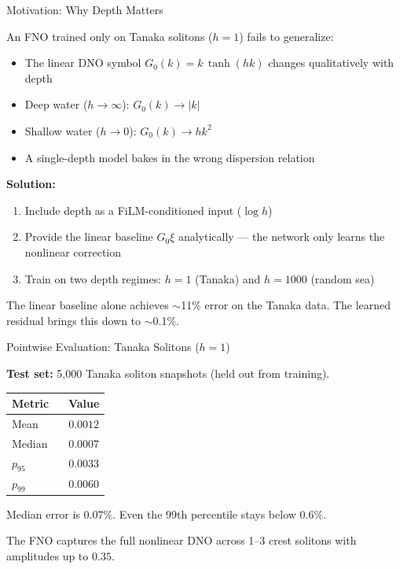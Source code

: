 \documentclass[aspectratio=169,11pt]{beamer}
\DeclareMathOperator{\relltwo}{rel\text{-}L^2}
\begin{document}
\begin{frame}{Motivation: Why Depth Matters}

An FNO trained only on Tanaka solitons ($h = 1$) fails to generalize:

\begin{itemize}
  \item The linear DNO symbol $G_0(k) = k\,\tanh(hk)$ changes qualitatively with depth
  \item Deep water ($h \to \infty$): $G_0(k) \to |k|$
  \item Shallow water ($h \to 0$): $G_0(k) \to hk^2$
  \item A single-depth model bakes in the wrong dispersion relation
\end{itemize}

\pause

\textbf{Solution:}
\begin{enumerate}
  \item Include depth as a FiLM-conditioned input ($\log h$)
  \item Provide the linear baseline $G_0\xi$ analytically --- the network only learns the nonlinear correction
  \item Train on two depth regimes: $h = 1$ (Tanaka) and $h = 1000$ (random sea)
\end{enumerate}

The linear baseline alone achieves $\sim$11\% error on the Tanaka data. The learned residual brings this down to $\sim$0.1\%.
\end{frame}

\begin{frame}{Pointwise Evaluation: Tanaka Solitons ($h = 1$)}

\textbf{Test set:} 5,000 Tanaka soliton snapshots (held out from training).

\pause

\begin{center}
\begin{tabular}{lc}
\toprule
Metric & Value \\
\midrule
Mean $\relltwo$   & $\mathbf{0.0012}$ \\
Median $\relltwo$ & $0.0007$ \\
$p_{95}$ $\relltwo$ & $0.0033$ \\
$p_{99}$ $\relltwo$ & $0.0060$ \\
\bottomrule
\end{tabular}
\end{center}


Median error is $0.07\%$. Even the 99th percentile stays below $0.6\%$.

The FNO captures the full nonlinear DNO across 1--3 crest solitons with amplitudes up to $0.35$.
\end{frame}
\end{document}
